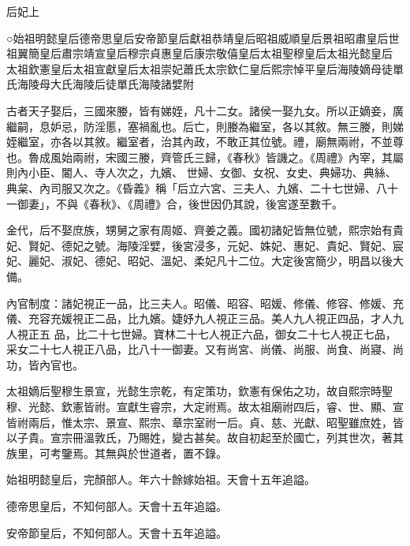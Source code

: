 
\begin{pinyinscope}

 后妃上



 ○始祖明懿皇后德帝思皇后安帝節皇后獻祖恭靖皇后昭祖威順皇后景祖昭肅皇后世祖翼簡皇后肅宗靖宣皇后穆宗貞惠皇后康宗敬僖皇后太祖聖穆皇后太祖光懿皇后
 太祖欽憲皇后太祖宣獻皇后太祖崇妃蕭氏太宗欽仁皇后熙宗悼平皇后海陵嫡母徒單氏海陵母大氏海陵后徒單氏海陵諸嬖附



 古者天子娶后，三國來媵，皆有娣姪，凡十二女。諸侯一娶九女。所以正嫡妾，廣繼嗣，息妒忌，防淫慝，塞禍亂也。后亡，則媵為繼室，各以其敘。無三媵，則娣姪繼室，亦各以其敘。繼室者，治其內政，不敢正其位號。禮，廟無兩祔，不並尊也。魯成風始兩祔，宋國三媵，齊管氏三歸，《春秋》皆譏之。《周禮》內宰，其屬則內小臣、閽人、寺人次之，九嬪、
 世婦、女御、女祝、女史、典婦功、典絲、典枲、內司服又次之。《昏義》稱「后立六宮、三夫人、九嬪、二十七世婦、八十一御妻」，不與《春秋》、《周禮》合，後世因仍其說，後宮遂至數千。



 金代，后不娶庶族，甥舅之家有周姬、齊姜之義。國初諸妃皆無位號，熙宗始有貴妃、賢妃、德妃之號。海陵淫嬖，後宮浸多，元妃、姝妃、惠妃、貴妃、賢妃、宸妃、麗妃、淑妃、德妃、昭妃、溫妃、柔妃凡十二位。大定後宮簡少，明昌以後大備。



 內官制度：諸妃視正一品，比三夫人。昭儀、昭容、昭媛、修儀、修容、修媛、充儀、充容充媛視正二品，比九嬪。婕妤九人視正三品。美人九人視正四品，才人九人視正五
 品，比二十七世婦。寶林二十七人視正六品，御女二十七人視正七品，采女二十七人視正八品，比八十一御妻。又有尚宮、尚儀、尚服、尚食、尚寢、尚功，皆內官也。



 太祖嫡后聖穆生景宣，光懿生宗乾，有定策功，欽憲有保佑之功，故自熙宗時聖穆、光懿、欽憲皆祔。宣獻生睿宗，大定祔焉。故太祖廟祔四后，睿、世、顯、宣皆祔兩后，惟太宗、景宣、熙宗、章宗室祔一后。貞、慈、光獻、昭聖雖庶姓，皆以子貴。宣宗冊溫敦氏，乃賜姓，變古甚矣。故自初起至於國亡，列其世次，著其族里，可考鑒焉。其無與於世道者，置不錄。



 始祖明懿皇后，完顏部人。年六十餘嫁始祖。天會十五年追謚。



 德帝思皇后，不知何部人。天會十五年追謚。



 安帝節皇后，不知何部人。天會十五年追謚。




\end{pinyinscope}
